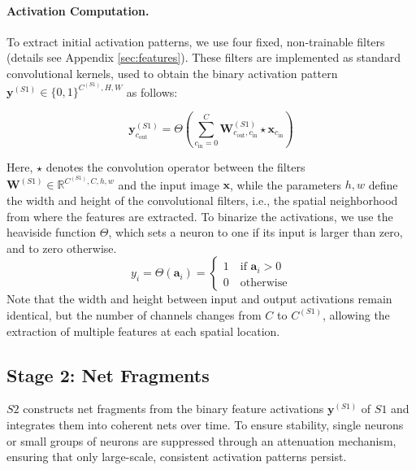 \documentclass[12pt]{article}
\begin{document}
\paragraph{Activation Computation.}
To extract initial activation patterns, we use four fixed, non-trainable filters (details see Appendix \ref{sec:features}). These filters are implemented as standard convolutional kernels, used to obtain the binary activation pattern $\boldsymbol{y}^{(S1)} \in \{0,1\}^{C^{(S1)}, H, W}$ as follows:

\begin{equation}
\boldsymbol{y}^{(S1)}_{c_{\text{out}}} = \Theta \left(\sum_{c_{\text{in}}=0}^C \boldsymbol{W}^{(S1)}_{c_{\text{out}},c_{\text{in}}} \star \boldsymbol{x}_{c_{\text{in}}} \right)
\label{eq:y_s1}
\end{equation}

Here, $\star$ denotes the convolution operator between the filters $\boldsymbol{W}^{(S1)} \in \mathbb{R}^{C^{(S1)}, C, h, w}$ and the input image $\boldsymbol{x}$, while the parameters  $h, w$ define the width and height of the convolutional filters, i.e., the spatial neighborhood from where the features are extracted.
To binarize the activations, we use the heaviside function $\Theta$, which sets a neuron to one if its input is larger than zero, and to zero otherwise.
%
\begin{equation}
  y_{i} = \Theta(\boldsymbol{a}_{i} ) = \begin{cases}
      1 \quad \text{if } \boldsymbol{a}_{i}  > 0\\
      0 \quad \text{otherwise}
  \end{cases}
  \label{eq:activation}
\end{equation}
%
Note that the width and height between input and output activations remain identical, but the number of channels changes from $C$ to $C^{(S1)}$, allowing the extraction of multiple features at each spatial location.

\subsection{Stage 2: Net Fragments}\label{sec:stage_2_impl}
$S2$ constructs net fragments from the binary feature activations $\boldsymbol{y}^{(S1)}$ of $S1$ and integrates them into coherent nets over time. To ensure stability, single neurons or small groups of neurons are suppressed through an attenuation mechanism, ensuring that only large-scale, consistent activation patterns persist. 
\end{document}
